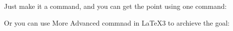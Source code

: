 \documentclass[12pt]{article}
\begin{document}
Just make it a command, and you can get the point using one command:
\begin{bytes}
\newcommand{\getmidpoint}[2][]{%
    \tkzDefMidPoint(#2) \tkzGetPoint{#1}
}
\end{bytes}
\newcommand{\getmidpoint}[2][]{%
    \tkzDefMidPoint(#2) \tkzGetPoint{#1}
}

\begin{multicols}{2}
    \begin{bytes}
    \end{bytes}
\end{multicols}



Or you can use More Advanced commnad in \LaTeX{}3 to archieve the goal:
\end{document}
